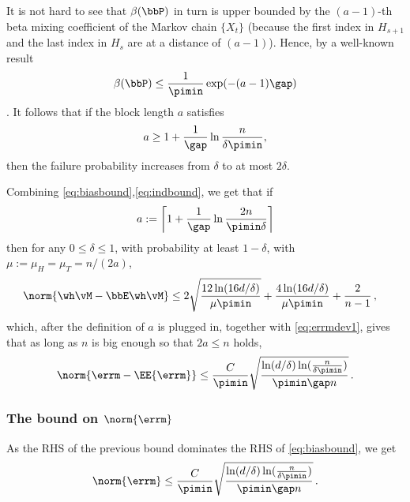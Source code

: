 It is not hard to see that $\beta(\bbP)$ in turn is upper bounded by 
the $(a-1)$-th beta mixing coefficient of the Markov chain $\{X_t\}$ (because the first
index in $H_{s+1}$ and the last index in $H_s$ are at a distance of $(a-1)$).
Hence, 
by a well-known result 
\[
  \beta(\bbP)
  \leq
  \frac{1}{\pimin} \exp(-(a-1)\gap)
\]
\citep[see, for instance,][]{bradley05}. 
It follows that if the block length $a$ satisfies
\begin{equation}
  \label{eq:block-length2}
  a \geq 1 + \frac{1}{\gap}\ln\frac{n}{\delta\pimin}
  ,
\end{equation}
then the failure probability increases from $\delta$ to at most
$2\delta$.

Combining \eqref{eq:biasbound},\eqref{eq:indbound}, we get that if
\[
  a := \left\lceil 1 + \frac{1}{\gap}\ln\frac{2n}{\pimin\delta} \right\rceil
\]
then for any $0\le \delta \le 1$, with probability at least $1-\delta$, with $\mu := \mu_H = \mu_T=n/(2a)$,
\begin{align*}
\norm{\wh\vM - \bbE \wh\vM }
& \le 
  2\sqrt{
    \frac{12\ln(16d/\delta)}{\mu\pimin}
  }
  +
  \frac{4\ln(16d/\delta)}{\mu\pimin}
  + 
  \frac{2}{n-1}\,,
\end{align*}
which, after the definition of $a$ is plugged in,
together with \eqref{eq:errmdev1},
 gives that as long as $n$ is big enough so that $2a\le n$ holds, 
\begin{align*}
\norm{\errm-\EE{\errm}}
\le \frac{C}{\pimin}
\sqrt{
    \frac{\ln(d/\delta)\ln(\frac{n}{\delta\pimin})}{\pimin\gap n}
  }
  \,.
\end{align*}
\subsubsection{The bound on $\norm{\errm}$}
As the RHS of the previous bound dominates the RHS of \eqref{eq:biasbound},
we get 
\begin{align}
\label{eq:doubletbound}
\norm{\errm}
\le \frac{C}{\pimin}
\sqrt{
    \frac{\ln(d/\delta)\ln(\frac{n}{\delta\pimin})}{\pimin\gap n}
  }\,.
\end{align}


